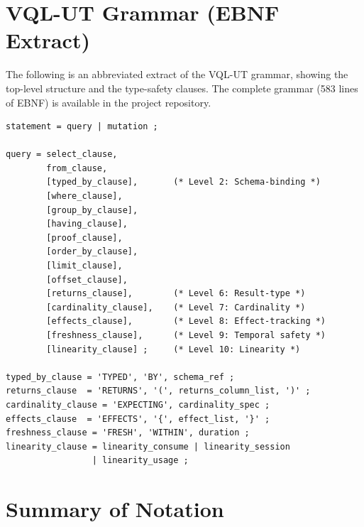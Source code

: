\documentclass[11pt,a4paper]{article}
\begin{document}
\appendix

\section{VQL-UT Grammar (EBNF Extract)}\label{app:grammar}

The following is an abbreviated extract of the VQL-UT grammar,
showing the top-level structure and the type-safety clauses.  The
complete grammar (583 lines of EBNF) is available in the project
repository.

\begin{lstlisting}[language={},basicstyle=\footnotesize\ttfamily,
  backgroundcolor=\color{bglight},frame=single]
statement = query | mutation ;

query = select_clause,
        from_clause,
        [typed_by_clause],       (* Level 2: Schema-binding *)
        [where_clause],
        [group_by_clause],
        [having_clause],
        [proof_clause],
        [order_by_clause],
        [limit_clause],
        [offset_clause],
        [returns_clause],        (* Level 6: Result-type *)
        [cardinality_clause],    (* Level 7: Cardinality *)
        [effects_clause],        (* Level 8: Effect-tracking *)
        [freshness_clause],      (* Level 9: Temporal safety *)
        [linearity_clause] ;     (* Level 10: Linearity *)

typed_by_clause = 'TYPED', 'BY', schema_ref ;
returns_clause  = 'RETURNS', '(', returns_column_list, ')' ;
cardinality_clause = 'EXPECTING', cardinality_spec ;
effects_clause  = 'EFFECTS', '{', effect_list, '}' ;
freshness_clause = 'FRESH', 'WITHIN', duration ;
linearity_clause = linearity_consume | linearity_session
                 | linearity_usage ;
\end{lstlisting}

\section{Summary of Notation}\label{app:notation}
\end{document}
